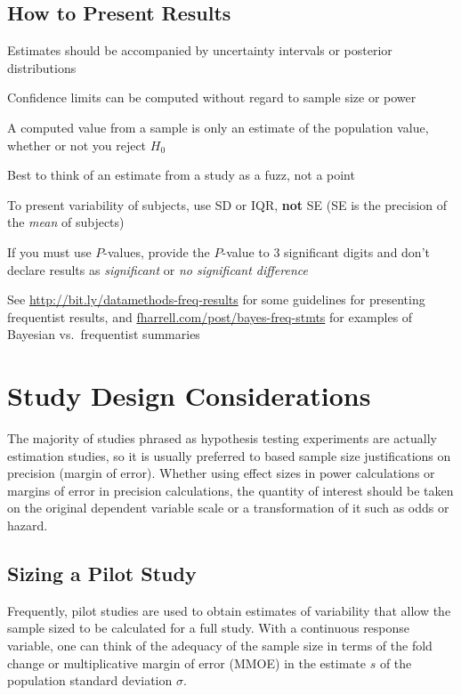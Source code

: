 \subsection{How to Present Results} 
\bi
\item Estimates should be accompanied by uncertainty intervals or posterior distributions
\item Confidence limits can be computed without regard to sample size
  or power
\item A computed value from a sample is only an estimate of the
  population value, whether or not you reject $H_0$
\item Best to think of an estimate from a study as a fuzz, not a point
\item To present variability of subjects, use SD or IQR, \textbf{not}
  SE (SE is the precision of the \emph{mean} of subjects)
\item If you must use $P$-values, provide the $P$-value to 3 significant digits and don't declare results as \emph{significant} or \emph{no significant difference}
\item See \href{https://discourse.datamethods.org/t/language-for-communicating-frequentist-results-about-treatment-effects}{http://bit.ly/datamethods-freq-results} for some guidelines for presenting frequentist results, and  \href{https://www.fharrell.com/post/bayes-freq-stmts}{fharrell.com/post/bayes-freq-stmts} for examples of Bayesian vs.\ frequentist summaries
\ei

\section{Study Design Considerations}
The majority of studies phrased as hypothesis testing experiments are
actually estimation studies, so it is usually preferred to based
sample size justifications on precision (margin of error).  Whether
using effect sizes in power calculations or margins of error in
precision calculations, the quantity of interest should be taken on
the original dependent variable scale or a transformation of it such
as odds or hazard.  

\subsection{Sizing a Pilot Study}
Frequently, pilot studies are used to obtain estimates of variability
that allow the sample sized to be calculated for a full study.  With a
continuous response variable, one can think of the adequacy of the
sample size in terms of the fold change or multiplicative margin of
error (MMOE) in the estimate $s$ of the population standard deviation $\sigma$.

